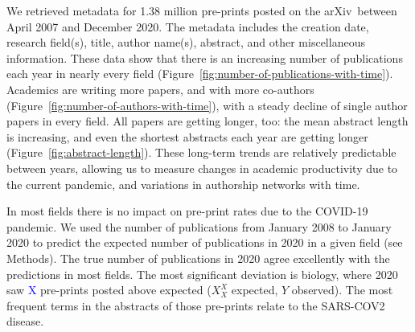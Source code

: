 \documentclass{nature}
\newcommand{\todo}[1]{\textcolor{blue}{#1}}
\newcommand{\arxiv}{arXiv}
\begin{document}
We retrieved metadata for 1.38 million pre-prints posted on the \arxiv\ between April 2007 and December 2020. The metadata includes the creation date, research field(s), title, author name(s), abstract, and other miscellaneous information. These data show that there is an increasing number of publications each year in nearly every field  (Figure~\ref{fig:number-of-publications-with-time}). Academics are writing more papers, and with more co-authors (Figure~\ref{fig:number-of-authors-with-time}), with a steady decline of single author papers in every field. All papers are getting longer, too: the mean abstract length is increasing, and even the shortest abstracts each year are getting longer (Figure~\ref{fig:abstract-length}). These long-term trends are relatively predictable between years, allowing us to measure changes in academic productivity due to the current pandemic, and variations in authorship networks with time.


In most fields there is no impact on pre-print rates due to the COVID-19 pandemic. We used the number of publications from January 2008 to January 2020 to predict the expected number of publications in 2020 in a given field (see Methods). The true number of publications in 2020 agree excellently with the predictions in most fields. The most significant deviation is biology, where 2020 saw \todo{X} pre-prints posted above expected ($X^{X}_{X}$ expected, $Y$ observed). The most frequent terms in the abstracts of those pre-prints relate to the SARS-COV2 disease. 
\end{document}
